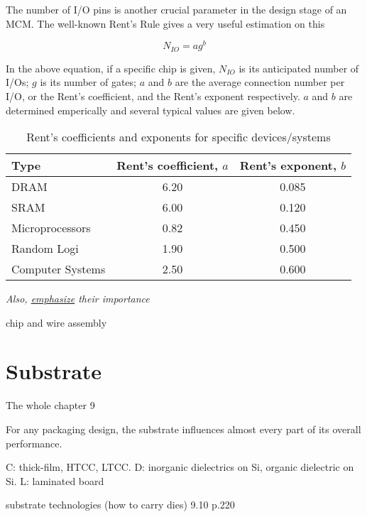 \begin{spacing}{1.5}
The number of I/O pins is another crucial parameter in the design stage of an MCM. The well-known Rent's Rule gives a very useful estimation on this 

\begin{equation}
    \label{eq.rent}
    N_{IO}=ag^b
\end{equation}

In the above equation, if a specific chip is given, $N_{IO}$ is its anticipated number of I/Os; $g$ is its number of gates; $a$ and $b$ are the average connection number per I/O, or the Rent's coefficient, and the Rent's exponent respectively. \cite{landman1971pin} $a$ and $b$ are determined emperically and several typical values are given below. \cite{tummala2001fundamentals}

\begin{table}[ht]
    \centering 
    \caption{Rent's coefficients and exponents for specific devices/systems} 
    \label{tb.rent} 
    \begin{tabular}[t]{lcc}
        \toprule 
        Type & Rent's coefficient, $a$ & Rent's exponent, $b$ \\ 
        \midrule 
        DRAM & 6.20 & 0.085 \\
        SRAM & 6.00 & 0.120 \\ 
        Microprocessors & 0.82 & 0.450 \\ 
        Random Logi & 1.90 & 0.500 \\
        Computer Systems & 2.50 & 0.600 \\ 
        \bottomrule
    \end{tabular}
\end{table}

\textit{Also, \underline{emphasize} their importance}

chip and wire assembly

\section{Substrate}

The whole chapter 9 \cite{chen2006vlsi}

For any packaging design, the substrate influences almost every part of its overall performance. 

C: thick-film, HTCC, LTCC. D: inorganic dielectrics on Si, organic dielectric on Si. L: laminated board

substrate technologies (how to carry dies) 9.10 p.220 \cite{chen2006vlsi} 

\end{spacing}
\newpage
